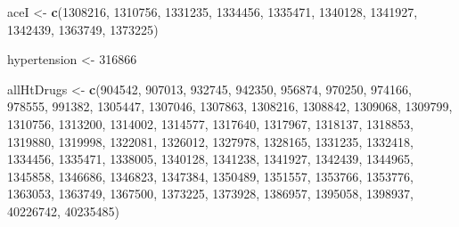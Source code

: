 \documentclass[11pt]{book}
\newenvironment{Shaded}{\begin{snugshade}}{\end{snugshade}}
\newcommand{\KeywordTok}[1]{\textcolor[rgb]{0.13,0.29,0.53}{\textbf{#1}}}
\newcommand{\DecValTok}[1]{\textcolor[rgb]{0.00,0.00,0.81}{#1}}
\newcommand{\StringTok}[1]{\textcolor[rgb]{0.31,0.60,0.02}{#1}}
\newcommand{\NormalTok}[1]{#1}
\theoremstyle{definition}
\theoremstyle{definition}
\theoremstyle{definition}
\theoremstyle{remark}
\begin{document}
\begin{Shaded}
\begin{Highlighting}[]
\NormalTok{aceI <-}\StringTok{ }\KeywordTok{c}\NormalTok{(}\DecValTok{1308216}\NormalTok{, }\DecValTok{1310756}\NormalTok{, }\DecValTok{1331235}\NormalTok{, }\DecValTok{1334456}\NormalTok{, }\DecValTok{1335471}\NormalTok{, }\DecValTok{1340128}\NormalTok{, }\DecValTok{1341927}\NormalTok{,}
          \DecValTok{1342439}\NormalTok{, }\DecValTok{1363749}\NormalTok{, }\DecValTok{1373225}\NormalTok{)}

\NormalTok{hypertension <-}\StringTok{ }\DecValTok{316866}

\NormalTok{allHtDrugs <-}\StringTok{ }\KeywordTok{c}\NormalTok{(}\DecValTok{904542}\NormalTok{, }\DecValTok{907013}\NormalTok{, }\DecValTok{932745}\NormalTok{, }\DecValTok{942350}\NormalTok{, }\DecValTok{956874}\NormalTok{, }\DecValTok{970250}\NormalTok{, }\DecValTok{974166}\NormalTok{,}
                  \DecValTok{978555}\NormalTok{, }\DecValTok{991382}\NormalTok{, }\DecValTok{1305447}\NormalTok{, }\DecValTok{1307046}\NormalTok{, }\DecValTok{1307863}\NormalTok{, }\DecValTok{1308216}\NormalTok{,}
                  \DecValTok{1308842}\NormalTok{, }\DecValTok{1309068}\NormalTok{, }\DecValTok{1309799}\NormalTok{, }\DecValTok{1310756}\NormalTok{, }\DecValTok{1313200}\NormalTok{, }\DecValTok{1314002}\NormalTok{,}
                  \DecValTok{1314577}\NormalTok{, }\DecValTok{1317640}\NormalTok{, }\DecValTok{1317967}\NormalTok{, }\DecValTok{1318137}\NormalTok{, }\DecValTok{1318853}\NormalTok{, }\DecValTok{1319880}\NormalTok{,}
                  \DecValTok{1319998}\NormalTok{, }\DecValTok{1322081}\NormalTok{, }\DecValTok{1326012}\NormalTok{, }\DecValTok{1327978}\NormalTok{, }\DecValTok{1328165}\NormalTok{, }\DecValTok{1331235}\NormalTok{,}
                  \DecValTok{1332418}\NormalTok{, }\DecValTok{1334456}\NormalTok{, }\DecValTok{1335471}\NormalTok{, }\DecValTok{1338005}\NormalTok{, }\DecValTok{1340128}\NormalTok{, }\DecValTok{1341238}\NormalTok{,}
                  \DecValTok{1341927}\NormalTok{, }\DecValTok{1342439}\NormalTok{, }\DecValTok{1344965}\NormalTok{, }\DecValTok{1345858}\NormalTok{, }\DecValTok{1346686}\NormalTok{, }\DecValTok{1346823}\NormalTok{,}
                  \DecValTok{1347384}\NormalTok{, }\DecValTok{1350489}\NormalTok{, }\DecValTok{1351557}\NormalTok{, }\DecValTok{1353766}\NormalTok{, }\DecValTok{1353776}\NormalTok{, }\DecValTok{1363053}\NormalTok{,}
                  \DecValTok{1363749}\NormalTok{, }\DecValTok{1367500}\NormalTok{, }\DecValTok{1373225}\NormalTok{, }\DecValTok{1373928}\NormalTok{, }\DecValTok{1386957}\NormalTok{, }\DecValTok{1395058}\NormalTok{,}
                  \DecValTok{1398937}\NormalTok{, }\DecValTok{40226742}\NormalTok{, }\DecValTok{40235485}\NormalTok{)}
\end{Highlighting}
\end{Shaded}
\end{document}

